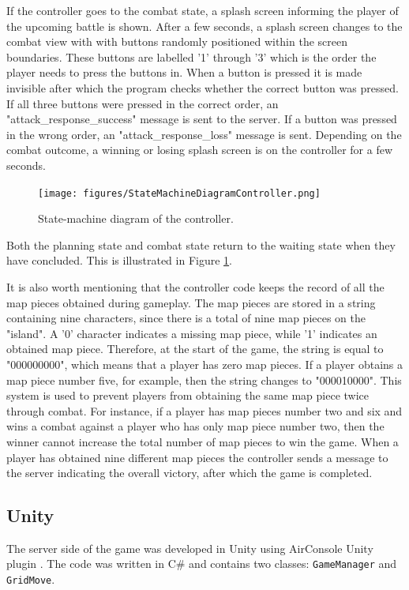 If the controller goes to the combat state, a splash screen informing the player of the upcoming battle is shown. After a few seconds, a splash screen changes to the combat view with with buttons randomly positioned within the screen boundaries. These buttons are labelled '1' through '3' which is the order the player needs to press the buttons in. When a button is pressed it is made invisible after which the program checks whether the correct button was pressed. If all three buttons were pressed in the correct order, an "attack\_response\_success" message is sent to the server. If a button was pressed in the wrong order, an "attack\_response\_loss" message is sent. Depending on the combat outcome, a winning or losing splash screen is on the controller for a few seconds. 

\begin{figure}
	\centering
	\texttt{[image: figures/StateMachineDiagramController.png]}
	\caption{State-machine diagram of the controller. \label{fig:stateMachine}}
\end{figure}

Both the planning state and combat state return to the waiting state when they have concluded.  This is illustrated in Figure \ref{fig:stateMachine}.

It is also worth mentioning that the controller code keeps the record of all the map pieces obtained during gameplay. The map pieces are stored in a string containing nine characters, since there is a total of nine map pieces on the "island". A '0' character indicates a missing map piece, while '1' indicates an obtained map piece. Therefore, at the start of the game, the string is equal to "000000000", which means that a player has zero map pieces. If a player obtains a map piece number five, for example, then the string changes to "000010000". This system is used to prevent players from obtaining the same map piece twice through combat. For instance, if a player has map pieces number two and six and wins a combat against a player who has only map piece number two, then the winner cannot increase the total number of map pieces to win the game. When a player has obtained nine different map pieces the controller sends a message to the server indicating the overall victory, after which the game is completed. 

\subsection{Unity}
The server side of the game was developed in Unity using AirConsole Unity plugin \cite{AirconsoleUnity}. The code was written in C\# and contains two classes: \texttt{GameManager} and \texttt{GridMove}.

